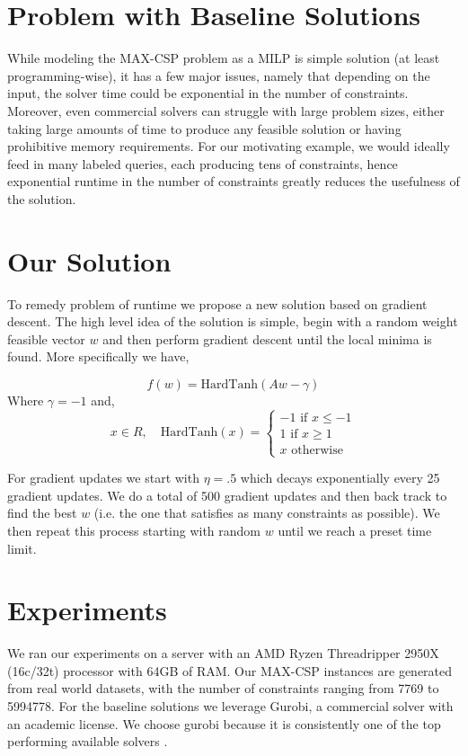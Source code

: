 \documentclass[a4paper]{article}
\begin{document}
\section{Problem with Baseline Solutions}

While modeling the MAX-CSP problem as a MILP is simple solution (at least programming-wise), 
it has a few major issues, namely that depending on the input, the solver time could be exponential in 
the number of constraints. Moreover, even commercial solvers can struggle with large problem sizes, 
either taking large amounts of time to produce any feasible solution or having prohibitive memory requirements.
For our motivating example, we would ideally feed in many labeled queries, 
each producing tens of constraints, hence exponential runtime in the number of constraints greatly 
reduces the usefulness of the solution. 


\section{Our Solution}

To remedy problem of runtime we propose a new solution based on gradient descent. The high level
idea of the solution is simple, begin with a random weight feasible vector $w$ and then perform 
gradient descent until the local minima is found. More specifically we have, 

$$
f(w) = \text{HardTanh}(Aw - \gamma)
$$
Where $ \gamma = -1$ and, 
$$
x\in R, \quad \text{HardTanh}(x) = \begin{cases} -1 \text{ if } x \leq -1\\ 1 \text{ if } x \geq 1\\ x \text{ otherwise}\end{cases}
$$

For gradient updates we start with $\eta = .5$ which decays exponentially every 25 gradient updates. We do a total 
of 500 gradient updates and then back track to find the best $w$ (i.e. the one that satisfies as many constraints as 
possible). We then repeat this process starting with random $w$ until we reach a preset time limit.

\section{Experiments}

We ran our experiments on a server with an AMD Ryzen Threadripper 2950X (16c/32t) processor with 
64GB of RAM. Our MAX-CSP instances are generated from real world datasets, with the number of constraints 
ranging from 7769 to 5994778. For the baseline solutions we 
leverage Gurobi, a commercial solver with an academic license. We choose gurobi because it is consistently 
one of the top performing available solvers \cite{benchmark}.
\end{document}
